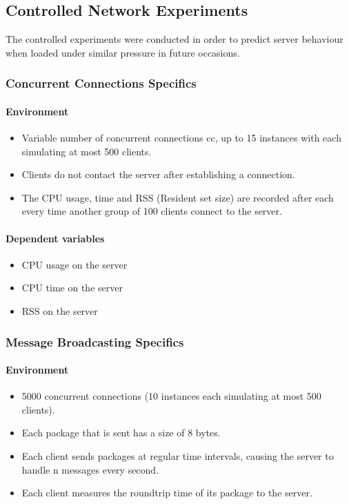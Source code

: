 \documentclass[bsc,frontabs,twoside,singlespacing,parskip,deptreport]{infthesis}     %
\begin{document}
\subsection{Controlled Network Experiments}
The controlled experiments were conducted in order to predict server behaviour when loaded under similar pressure in future occasions. 

\subsubsection{Concurrent Connections Specifics}
\paragraph{Environment}
\begin{itemize}
\item Variable number of concurrent connections cc, up to 15 instances with each simulating at most 500 clients.
\item Clients do not contact the server after establishing a connection.
\item The CPU usage, time and RSS (Resident set size) are recorded after each every time another group of 100 clients connect to the server.
\end{itemize}
\paragraph{Dependent variables}
\begin{itemize}
\item CPU usage on the server
\item CPU time on the server
\item RSS on the server
\end{itemize}

\subsubsection{Message Broadcasting Specifics}
\paragraph{Environment}
\begin{itemize}
\item 5000 concurrent connections (10 instances each simulating at most 500 clients).
\item Each package that is sent has a size of 8 bytes.
\item Each client sends packages at regular time intervals, causing the server to handle n messages every second.
\item Each client measures the roundtrip time of its package to the server.
\end{itemize}
\end{document}

